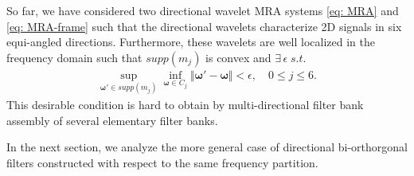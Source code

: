 

So far, we have considered two directional wavelet MRA systems \eqref{eq: MRA} and \eqref{eq: MRA-frame} such that the directional wavelets characterize 2D signals in six equi-angled directions. 
Furthermore, these wavelets are well localized in the frequency domain such that $supp(m_j)$ is convex and $\exists\,\epsilon\; s.t.$
\begin{align}\label{eq: no-alians}
 \sup_{\boldsymbol{\omega}'\in supp(m_j)}\inf_{\boldsymbol{\omega}\in C_j}\Vert\boldsymbol{\omega'} - \boldsymbol{\omega}\Vert < \epsilon,\quad  0\leq j\leq 6.
\end{align}
This desirable condition is hard to obtain by multi-directional filter bank assembly of several elementary filter banks.

In the next section, we analyze the more general case of directional bi-orthorgonal filters constructed with respect to the same frequency partition. 